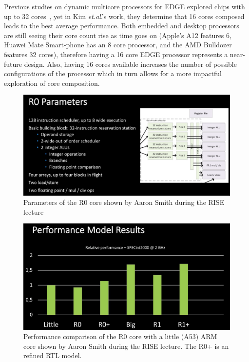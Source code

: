 Previous studies on dynamic multicore processors for EDGE explored chips with up to 32 cores~\cite{kim2007tflex, gulati2008multitaskingdmc}, yet in Kim {\it et.al}.'s work, they determine that 16 cores composed leads to the best average performance.
Both embedded and desktop processors are still seeing their core count rise as time goes on (Apple's A12 features 6, Huawei Mate Smart-phone has an 8 core processor, and the AMD Bulldozer features 32 cores), therefore having a 16 core EDGE processor represents a near-future design.
Also, having 16 cores available increases the number of possible configurations of the processor which in turn allows for a more impactful exploration of core composition.

\begin{figure}[t]
  \centering
    \includegraphics[width=1\textwidth]{setup/r0_parameters.png}
    \caption{Parameters of the R0 core shown by Aaron Smith during the RISE lecture}\label{fig:r0}
\end{figure}

\begin{figure}[t]
  \centering
    \includegraphics[width=1\textwidth]{setup/results.png}
    \caption{Performance comparison of the R0 core with a little (A53) ARM core shown by Aaron Smith during the RISE lecture. The R0+ is an refined RTL model.}\label{fig:r0perf}
\end{figure}

